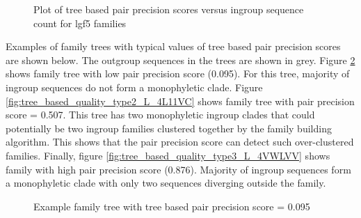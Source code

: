 \documentclass{article}
\begin{document}
		\begin{figure}[h!]
			\caption{Plot of tree based pair precision scores versus ingroup sequence count for lgf5 families}
			\label{fig:scatter_tree_precision_vs_seqct_lgf5}
		\end{figure}
		
		Examples of family trees with typical values of tree based pair precision scores are shown below. The outgroup sequences in the trees are shown in grey. Figure \ref{fig:tree_based_quality_type1_L_J5W12Z} shows family tree with low pair precision score (0.095). For this tree, majority of ingroup sequences do not form a monophyletic clade. Figure \ref{fig:tree_based_quality_type2_L_4L11VC} shows family tree with pair precision score = 0.507. This tree has two monophyletic ingroup clades that could potentially be two ingroup families clustered together by the family building algorithm. This shows that the pair precision score can detect such over-clustered families. Finally, figure \ref{fig:tree_based_quality_type3_L_4VWLVV} shows family with high pair precision score (0.876). Majority of ingroup  sequences form a monophyletic clade with only two sequences diverging outside the family.
		
			
		\begin{figure}[h!]
			\caption{Example family tree with tree based pair precision score = 0.095}
			\label{fig:tree_based_quality_type1_L_J5W12Z}
		\end{figure}
		
\end{document}
